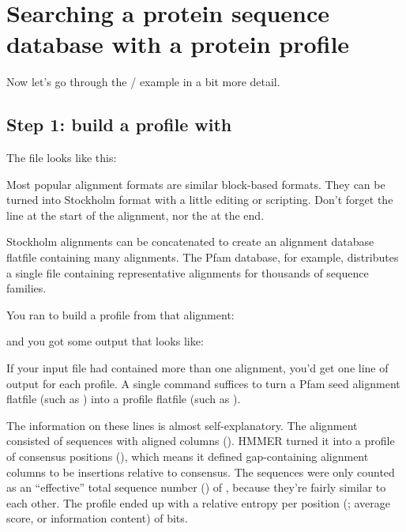 \section{Searching a protein sequence database with a protein profile}

Now let's go through the / example in a
bit more detail.

\subsection{Step 1: build a profile with }

The file  looks like this:


Most popular alignment formats are similar block-based formats. They
can be turned into Stockholm format with a little editing or
scripting. Don't forget the  line at the start
of the alignment, nor the \mono{//} at the end. 

Stockholm alignments can be concatenated to create an alignment
database flatfile containing many alignments. The Pfam database, for
example, distributes a single file containing representative
alignments for thousands of sequence families.

You ran  to build a profile from that
alignment:

   \vspace{1ex}
   \vspace{1ex}

and you got some output that looks like:


If your input file had contained more than one alignment, you'd get
one line of output for each profile. A single  command
suffices to turn a Pfam seed alignment flatfile (such as
) into a profile flatfile (such as
).

The information on these lines is almost self-explanatory. The
 alignment consisted of \BGLnseq{} sequences with
\BGLalen{} aligned columns (). HMMER turned it into a profile
of \BGLmlen{} consensus positions (), which means it
defined \BGLgaps{} gap-containing alignment columns to be insertions
relative to consensus. The \BGLnseq{} sequences were only counted as
an ``effective'' total sequence number () of
\BGLeffn{}, because they're fairly similar to each
other.
The profile ended up with a relative entropy per position
(; average score, or information content) of \BGLre{}
bits.

